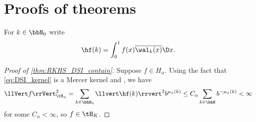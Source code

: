 \documentclass[acmsmall]{acmart}
\begin{document}
%




\appendix 

\section{Proofs of theorems} \label{appendix:proofs}

For $k \in \bbN_0$ write
$$\hf(k) = \int_0^1 f(x) \overline{\wal_k(x)} \D x.$$

\begin{proof}[Proof of \cref{thm:RKHS_DSI_contain}] 
    Suppose $f \in H_\alpha$. Using the fact that \eqref{eq:DSI_kernel} is a Mercer kernel and \citep[Theorem 14, Remark 19]{dick.decay_walsh_coefficients_smooth_functions}, we have 
    $$\llVert f \rrVert_{\tH_\alpha}^2 = \sum_{k \in \bbN_0} \llvert \hf(k) \rrvert^2 b^{\mu_\alpha(k)} \leq C_\alpha \sum_{k \in \bbN} b^{-\mu_\alpha(k)} < \infty$$ 
    for some $C_\alpha < \infty$, so $f \in \tH_K$.
\end{proof}
\end{document}
